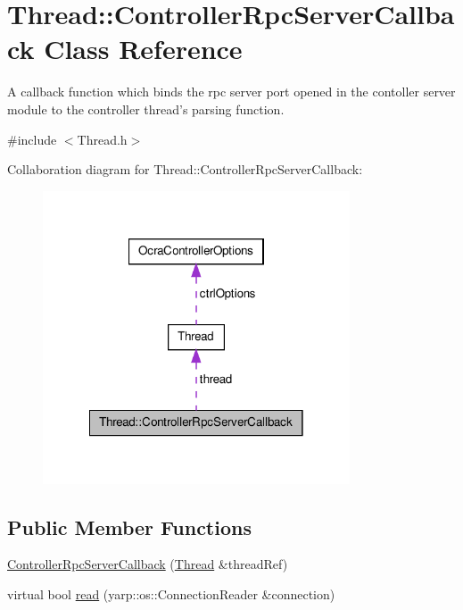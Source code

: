 \hypertarget{classThread_1_1ControllerRpcServerCallback}{\section{\-Thread\-:\-:\-Controller\-Rpc\-Server\-Callback \-Class \-Reference}
\label{classThread_1_1ControllerRpcServerCallback}
}


\-A callback function which binds the rpc server port opened in the contoller server module to the controller thread's parsing function.  




{\ttfamily \#include $<$\-Thread.\-h$>$}



\-Collaboration diagram for \-Thread\-:\-:\-Controller\-Rpc\-Server\-Callback\-:
\nopagebreak
\begin{figure}[H]
\begin{center}
\leavevmode
\includegraphics[width=258pt]{classThread_1_1ControllerRpcServerCallback__coll__graph}
\end{center}
\end{figure}
\subsection*{\-Public \-Member \-Functions}
\begin{DoxyCompactItemize}
\item 
\hyperlink{classThread_1_1ControllerRpcServerCallback_ad836e4cdaafc42ad309b5248ef38c280}{\-Controller\-Rpc\-Server\-Callback} (\hyperlink{classThread}{\-Thread} \&thread\-Ref)
\item 
virtual bool \hyperlink{classThread_1_1ControllerRpcServerCallback_a61f5510543f1bb96793dceca13eb6865}{read} (yarp\-::os\-::\-Connection\-Reader \&connection)
\end{DoxyCompactItemize}

